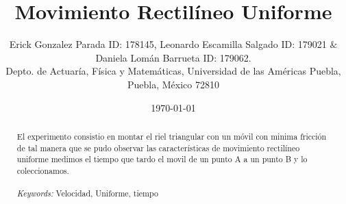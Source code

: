 \documentclass{article}
\begin{document}

\renewcommand{\footrulewidth}{1pt}
\renewcommand{\tablename}{Tabla}
\renewcommand{\figurename}{Figura}


\title{Movimiento Rectilíneo Uniforme}
\author{\small{Erick Gonzalez Parada ID: 178145, Leonardo Escamilla Salgado ID: 179021 $\&$ Daniela Lomán Barrueta ID: 179062.}\\		%
	   \small{Depto. de Actuaría, Física y Matemáticas, Universidad de las Américas Puebla, Puebla, M\'exico 72810}}
\date{\small{\today}}

\maketitle


\begin{abstract}

El experimento consistio en montar el riel triangular con un móvil con minima fricción de tal manera que se pudo observar las características de movimiento rectilíneo uniforme medimos el tiempo que tardo el movil de un punto A a un punto B y lo coleccionamos.
\\
\\
{\it Keywords:}  Velocidad, Uniforme, tiempo
\\
\\
\end{abstract}
\end{document}
